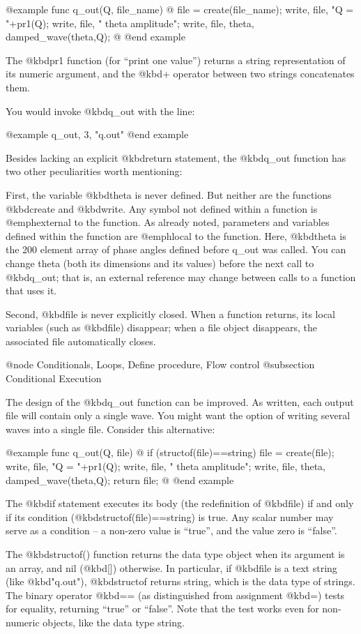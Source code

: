 {@example
func q_out(Q, file_name)
@{
  file = create(file_name);
  write, file, "Q = "+pr1(Q);
  write, file, "   theta       amplitude";
  write, file, theta, damped_wave(theta,Q);
@}
@end example

The @kbd{pr1} function (for ``print one value'') returns a string
representation of its numeric argument, and the @kbd{+} operator
between two strings concatenates them.

You would invoke @kbd{q_out} with the line:

@example
q_out, 3, "q.out"
@end example

Besides lacking an explicit @kbd{return} statement, the @kbd{q_out}
function has two other peculiarities worth mentioning:

First, the variable @kbd{theta} is never defined.  But neither are the
functions @kbd{create} and @kbd{write}.  Any symbol not defined within
a function is @emph{external} to the function.  As already noted,
parameters and variables defined within the function are @emph{local}
to the function.  Here, @kbd{theta} is the 200 element array of phase
angles defined before q_out was called.  You can change theta (both
its dimensions and its values) before the next call to @kbd{q_out};
that is, an external reference may change between calls to a function
that uses it.

Second, @kbd{file} is never explicitly closed.  When a function
returns, its local variables (such as @kbd{file}) disappear; when a
file object disappears, the associated file automatically closes.


@node Conditionals, Loops, Define procedure, Flow control
@subsection Conditional Execution

The design of the @kbd{q_out} function can be improved.  As written,
each output file will contain only a single wave.  You might want the
option of writing several waves into a single file.  Consider this
alternative:

@example
func q_out(Q, file)
@{
  if (structof(file)==string) file = create(file);
  write, file, "Q = "+pr1(Q);
  write, file, "   theta       amplitude";
  write, file, theta, damped_wave(theta,Q);
  return file;
@}
@end example

The @kbd{if} statement executes its body (the redefinition of
@kbd{file}) if and only if its condition
(@kbd{structof(file)==string}) is true.  Any scalar number may serve
as a condition -- a non-zero value is ``true'', and the value zero is
``false''.

The @kbd{structof()} function returns the data type object when its
argument is an array, and nil (@kbd{[]}) otherwise.  In particular, if
@kbd{file} is a text string (like @kbd{"q.out"}), @kbd{structof}
returns string, which is the data type of strings.  The binary
operator @kbd{==} (as distinguished from assignment @kbd{=}) tests for
equality, returning ``true'' or ``false''.  Note that the test works
even for non-numeric objects, like the data type string.

}

